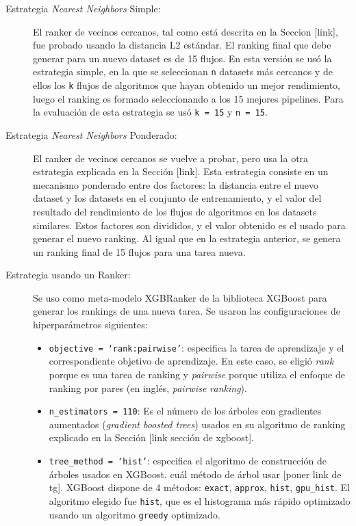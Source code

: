 \begin{description}
	\item[Estrategia \textit{Nearest Neighbors} Simple:] El ranker de vecinos cercanos, tal como está descrita en la Seccion [link], fue probado usando la distancia L2 estándar. El ranking final que debe generar para un nuevo dataset es de 15 flujos. En esta versión se usó la estrategia simple, en la que se seleccionan \texttt{n} datasets más cercanos y de ellos los \texttt{k} flujos de algoritmos que hayan obtenido un mejor rendimiento, luego el ranking es formado seleccionando a los 15 mejores pipelines. Para la evaluación de esta estrategia se usó \texttt{k = 15} y \texttt{n = 15}.
	\item[Estrategia \textit{Nearest Neighbors} Ponderado:] El ranker de vecinos cercanos se vuelve a probar, pero usa la otra estrategia explicada en la Sección [link]. Esta estrategia consiste en un mecanismo ponderado entre dos factores: la distancia entre el nuevo dataset y los datasets en el conjunto de entrenamiento, y el valor del resultado del rendimiento de los flujos de algoritmos en los datasets similares. Estos factores son divididos, y el valor obtenido es el usado para generar el nuevo ranking. Al igual que en la estrategia anterior, se genera un ranking final de 15 flujos para una tarea nueva.
	\item[Estrategia usando un Ranker:] Se uso como meta-modelo XGBRanker de la biblioteca XGBoost para generar los rankings de una nueva tarea. Se usaron las configuraciones de hiperparámetros siguientes: 	
	\begin{itemize}
		\item \texttt{objective = `rank:pairwise'}: especifica la tarea de aprendizaje y el correspondiente objetivo de aprendizaje. En este caso, se eligió \textit{rank} porque es una tarea de ranking y \textit{pairwise} porque utiliza el enfoque de ranking por pares (en inglés, \textit{pairwise ranking}).
		\item \texttt{n\_estimators = 110}: Es el número de los árboles con gradientes aumentados (\textit{gradient boosted trees}) usados en su algoritmo de ranking explicado en la Sección [link sección de xgboost].
		\item \texttt{tree\_method = `hist'}: especifica el algoritmo de construcción de árboles usados en XGBoost.  cuál método de árbol usar [poner link de tg]. XGBoost dispone de 4 métodos: \texttt{exact}, \texttt{approx}, \texttt{hist}, \texttt{gpu\_hist}. El algoritmo elegido fue \texttt{hist}, que es el histograma más rápido optimizado usando un algoritmo \texttt{greedy} optimizado.

\end{itemize}
\end{description}
